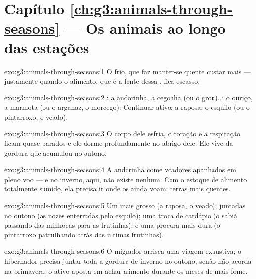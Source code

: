 \section*{Capítulo \ref{ch:g3:animals-through-seasons} --- Os animais ao longo das estações}

\begin{solution}{exo:g3:animals-through-seasons:1}
O frio, que faz manter-se quente custar mais  --- justamente
quando o alimento, que é a fonte dessa , fica escasso.
\end{solution}

\begin{solution}{exo:g3:animals-through-seasons:2}
: a andorinha, a cegonha (ou o grou). : o ouriço, a
marmota (ou o arganaz, o morcego). Continuar ativo: a raposa, o
esquilo (ou o pintarroxo, o veado).
\end{solution}

\begin{solution}{exo:g3:animals-through-seasons:3}
O corpo dele esfria, o coração e a respiração ficam quase parados e
ele dorme profundamente no abrigo dele. Ele vive da gordura que
acumulou no outono.
\end{solution}

\begin{solution}{exo:g3:animals-through-seasons:4}
A andorinha come  voadores apanhados em pleno voo --- e no
inverno, aqui, não existe nenhum. Com o estoque de alimento
totalmente sumido, ela precisa ir onde os  ainda voam: terras
mais quentes.
\end{solution}

\begin{solution}{exo:g3:animals-through-seasons:5}
Um  mais grosso (a raposa, o veado);  juntadas no outono (as nozes enterradas pelo esquilo); uma
troca de cardápio (o sabiá passando das minhocas para as
frutinhas); e uma procura mais dura (o pintarroxo patrulhando atrás
das últimas frutinhas).
\end{solution}

\begin{solution}{exo:g3:animals-through-seasons:6}
O migrador arrisca uma viagem exaustiva; o hibernador precisa juntar
toda a gordura de inverno no outono, senão não acorda na primavera;
o  ativo aposta em achar alimento durante os meses de mais
fome.
\end{solution}

